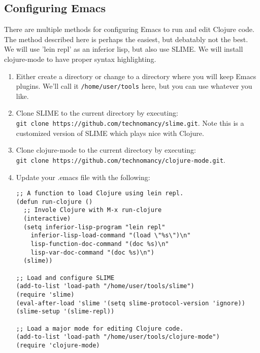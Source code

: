 \documentclass[letterpaper,colorlinks=true,linkcolor=blue]{book}
\begin{document}
\subsection{Configuring Emacs}

There are multiple methods for configuring Emacs to run and edit Clojure code. The method described
here is perhaps the easiest, but debatably not the best. We will use 'lein repl' as an inferior
lisp, but also use SLIME. We will install clojure-mode to have proper syntax highlighting. 

\begin{enumerate}
  \item Either create a directory or change to a directory where you will keep Emacs
  plugins. We'll call it \texttt{/home/user/tools} here, but you can use whatever 
  you like.
  \item Clone SLIME to the current directory by executing:\\
    \texttt{git clone https://github.com/technomancy/slime.git}. Note this is a customized version of
    SLIME which plays nice with Clojure.
  \item Clone clojure-mode to the current directory by executing:\\
    \texttt{git clone https://github.com/technomancy/clojure-mode.git}.
  \item Update your .emacs file with the following:\\
  \begin{verbatim}
;; A function to load Clojure using lein repl.
(defun run-clojure ()
  ;; Invole Clojure with M-x run-clojure
  (interactive)
  (setq inferior-lisp-program "lein repl"
    inferior-lisp-load-command "(load \"%s\")\n"
    lisp-function-doc-command "(doc %s)\n"
    lisp-var-doc-command "(doc %s)\n")
  (slime))

;; Load and configure SLIME
(add-to-list 'load-path "/home/user/tools/slime")
(require 'slime)
(eval-after-load 'slime '(setq slime-protocol-version 'ignore))
(slime-setup '(slime-repl))
 
;; Load a major mode for editing Clojure code.
(add-to-list 'load-path "/home/user/tools/clojure-mode")
(require 'clojure-mode)
  \end{verbatim}
\end{enumerate}
\end{document}
